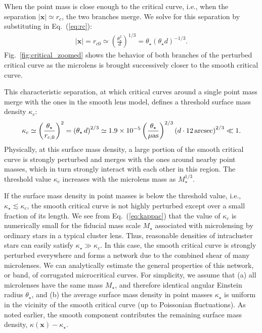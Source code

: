 \documentclass{aastex6}
\newcommand{\bt}[1]{\mathbf #1}
\newcommand{\refeq}[1]{Eq.~(\ref{eq:#1})}
\newcommand{\reffig}[1]{Fig.~\ref{fig:#1}}
\newcommand{\ba}{\begin{eqnarray}}
\newcommand{\ea}{\end{eqnarray}}
\begin{document}
 When the point mass is close enough to the critical curve, i.e.,
when the separation $|\bt x| \simeq r_c$, the two branches merge. We
solve for this separation by substituting in \refeq{rc}:
\ba
|\bt x| = r_{c0} \simeq \left( \frac{\theta^2_\star}{d} \right)^{1/3}
 = \theta_\star \left( \theta_\star d \right)^{-1/3}.
\ea
\reffig{critical_zoomed} shows the behavior of both branches of the perturbed critical curve as the microlens is brought successively closer to the smooth critical curve.

This characteristic separation, at which critical curves around a single point mass merge with the ones in the smooth lens model, defines a threshold surface mass density $\kappa_c$:
\ba
\label{eq:kappac}
\kappa_c \simeq \left( \frac{\theta_\star}{r_{c,0}} \right)^2 =
 \left( \theta_\star\, d \right)^{2/3} \simeq
 1.9 \times 10^{-5}
 \left( \frac{\theta_\star}{\mu{\rm as}} \right)^{2/3}
 \left( d \cdot 12\, {\rm arcsec} \right)^{2/3} \ll 1.
\ea
Physically, at this surface mass density, a large portion of the smooth critical curve is strongly perturbed and merges with
the ones around nearby point masses, which in turn strongly interact with each other in this region. The threshold value $\kappa_c$ increases with the microlens mass as $M_\star^{1/3}$.

If the surface mass density in point masses is below the threshold value, i.e., $\kappa_\star \lesssim \kappa_c$, the smooth critical curve is not highly perturbed except over a small fraction of its length. 
We see from \refeq{kappac} that the value of $\kappa_c$ is numerically small for the fiducial mass scale $M_\star$ associated with microlensing by ordinary stars in a typical cluster lens. Thus, reasonable densities of intracluster stars can easily satisfy $\kappa_\star \gg \kappa_c$. In this case, the smooth critical curve is strongly perturbed everywhere and forms a network due to the combined shear of many microlenses. We can analytically estimate the general properties of this network, or band, of corrugated microcritical curves. For simplicity, we assume that (a) all microlenses have the same mass $M_\star$, and therefore identical angular Einstein radius $\theta_\star$, and (b) the average surface mass density in point masses $\kappa_\star$ is uniform in the vicinity of the smooth critical curve (up to Poissonian fluctuations). As noted earlier, the smooth component contributes the remaining surface mass density, $\kappa(\bt x) - \kappa_\star$. 
\end{document}
